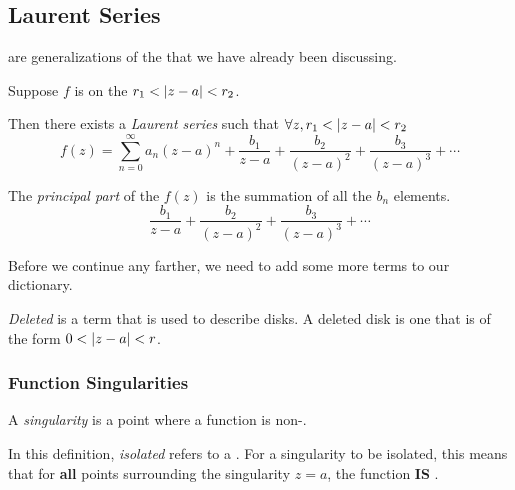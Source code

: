 \subsection{Laurent Series}\label{def:Laurent_Series}
 are generalizations of the  that we have already been discussing.

\begin{theorem}\label{thm:Laurent_Series}
  Suppose $f$ is  on the  $r_{1} < \left\lvert z-a \right\rvert < r_{2}$.

  Then there exists a \emph{Laurent series} such that $\forall z, r_{1} < \left\lvert z-a \right\rvert < r_{2}$
  \begin{equation}\label{eq:Laurent_Series}
    f(z) = \sum_{n=0}^{\infty} a_{n} {(z-a)}^{n} + \frac{b_{1}}{z-a} + \frac{b_{2}}{{(z-a)}^{2}} + \frac{b_{3}}{{(z-a)}^{3}} + \cdots
  \end{equation}
\end{theorem}

\begin{definition}\label{def:Principal_Part}
  The \emph{principal part} of the  $f(z)$ is the summation of all the $b_{n}$ elements.
  \begin{equation}\label{eq:Principal_Part}
    \frac{b_{1}}{z-a} + \frac{b_{2}}{{(z-a)}^{2}} + \frac{b_{3}}{{(z-a)}^{3}} + \cdots
  \end{equation}
\end{definition}

Before we continue any farther, we need to add some more terms to our dictionary.

\begin{definition}[Deleted]\label{def:Deleted}
  \emph{Deleted} is a term that is used to describe disks.
  A deleted disk is one that is of the form $0 < \left\lvert z-a \right\rvert < r$.
\end{definition}

\subsubsection{Function Singularities}\label{subsubsec:Function_Singularities}
\begin{definition}[Singularity]\label{def:Singularity}
  A \emph{singularity} is a point where a function is non-.
\end{definition}

\begin{definition}[Isolated]\label{def:Isolated_Singularity}
  In this definition, \emph{isolated} refers to a .
  For a singularity to be isolated, this means that for \textbf{all} points surrounding the singularity $z=a$, the function \textbf{IS} .
\end{definition}

